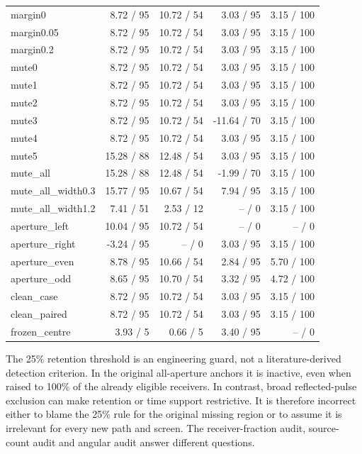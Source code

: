 \documentclass[11pt]{article}
\begin{document}
\begin{longtable}{@{}lrrrr@{}}
margin0 & 8.72 / 95 & 10.72 / 54 & 3.03 / 95 & 3.15 / 100\\
margin0.05 & 8.72 / 95 & 10.72 / 54 & 3.03 / 95 & 3.15 / 100\\
margin0.2 & 8.72 / 95 & 10.72 / 54 & 3.03 / 95 & 3.15 / 100\\
mute0 & 8.72 / 95 & 10.72 / 54 & 3.03 / 95 & 3.15 / 100\\
mute1 & 8.72 / 95 & 10.72 / 54 & 3.03 / 95 & 3.15 / 100\\
mute2 & 8.72 / 95 & 10.72 / 54 & 3.03 / 95 & 3.15 / 100\\
mute3 & 8.72 / 95 & 10.72 / 54 & -11.64 / 70 & 3.15 / 100\\
mute4 & 8.72 / 95 & 10.72 / 54 & 3.03 / 95 & 3.15 / 100\\
mute5 & 15.28 / 88 & 12.48 / 54 & 3.03 / 95 & 3.15 / 100\\
mute\_\allowbreak all & 15.28 / 88 & 12.48 / 54 & -1.99 / 70 & 3.15 / 100\\
mute\_\allowbreak all\_\allowbreak width0.3 & 15.77 / 95 & 10.67 / 54 & 7.94 / 95 & 3.15 / 100\\
mute\_\allowbreak all\_\allowbreak width1.2 & 7.41 / 51 & 2.53 / 12 & -- / 0 & 3.15 / 100\\
aperture\_\allowbreak left & 10.04 / 95 & 10.72 / 54 & -- / 0 & -- / 0\\
aperture\_\allowbreak right & -3.24 / 95 & -- / 0 & 3.03 / 95 & 3.15 / 100\\
aperture\_\allowbreak even & 8.78 / 95 & 10.66 / 54 & 2.84 / 95 & 5.70 / 100\\
aperture\_\allowbreak odd & 8.65 / 95 & 10.70 / 54 & 3.32 / 95 & 4.72 / 100\\
clean\_\allowbreak case & 8.72 / 95 & 10.72 / 54 & 3.03 / 95 & 3.15 / 100\\
clean\_\allowbreak paired & 8.72 / 95 & 10.72 / 54 & 3.03 / 95 & 3.15 / 100\\
frozen\_\allowbreak centre & 3.93 / 5 & 0.66 / 5 & 3.40 / 95 & -- / 0\\
\bottomrule\end{longtable}\endgroup

The 25\% retention threshold is an engineering guard, not a literature-derived detection criterion. In the original all-aperture anchors it is inactive, even when raised to 100\% of the already eligible receivers. In contrast, broad reflected-pulse exclusion can make retention or time support restrictive. It is therefore incorrect either to blame the 25\% rule for the original missing region or to assume it is irrelevant for every new path and screen. The receiver-fraction audit, source-count audit and angular audit answer different questions.
\end{document}
